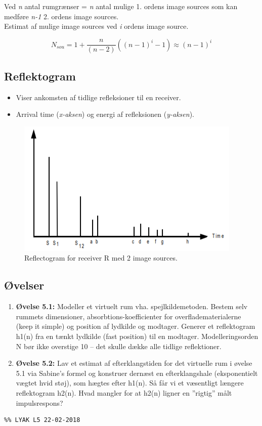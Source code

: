 \noindent Ved \textit{n} antal rumgrænser = \textit{n} antal mulige 1. ordens image sources som kan medføre \textit{n-1} 2. ordens image sources. \\

\noindent Estimat af mulige image sources ved \textit{i} ordens image source. 

\begin{equation}
N_{sou}=1+\dfrac{n}{(n-2)}((n-1)^i -1)\approx (n-1)^i
\end{equation}

\newpage
\subsection{Reflektogram}
\begin{itemize}
	\item Viser ankomsten af tidlige refleksioner til en receiver.
	\item Arrival time (\textit{x-aksen}) og energi af refleksionen (\textit{y-aksen}).
\end{itemize}

\begin{figure} [H]
	\centering
	\includegraphics[width=.75\linewidth]{graphics/19.png}
	\caption{Reflectogram for receiver R med 2 image sources.}
	\label{fig:19}
\end{figure}

\subsection{Øvelser}
\begin{enumerate}
	\item \textbf{Øvelse 5.1:} Modeller et virtuelt rum vha. spejlkildemetoden. Bestem selv rummets dimensioner, absorbtions-koefficienter for overfladematerialerne (keep it simple) og position af lydkilde og modtager. Generer et reflektogram h1(n) fra en tænkt lydkilde (fast position) til en modtager. Modelleringsorden N bør ikke overstige 10 – det skulle dække alle tidlige reflektioner.
	\item \textbf{Øvelse 5.2:} Lav et estimat af efterklangstiden for det virtuelle rum i øvelse 5.1 via Sabine’s formel og konstruer dernæst en efterklangshale (eksponentielt vægtet hvid støj), som hægtes efter h1(n). Så får vi et væsentligt længere reflektogram h2(n). Hvad mangler for at h2(n) ligner en ”rigtig” målt impulsrespons?
\end{enumerate}


\begin{lstlisting}
%% LYAK L5 22-02-2018

\end{lstlisting}
